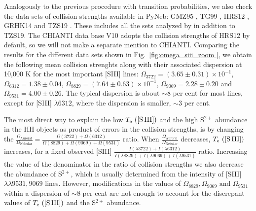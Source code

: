 \documentclass[fleqn,usenatbib]{mnras}
\begin{document}
Analogously to the previous procedure with transition probabilities, we also check the data sets of collision strengths available in PyNeb: GMZ95 \citep[][]{GMZ95}, TG99 \citep[][]{TG99}, HRS12 \citep[][]{HRS12}, GRHK14 \citep[][]{GRHK14} and TZS19 \citep[][]{TZS19}. These includes all the sets analyzed by \citet{Juan-de-Dios17} in addition to TZS19. The CHIANTI data base V10 adopts the collision strengths of HRS12 by default, so we will not make a separate mention to CHIANTI. Comparing the results for the different data sets shown in Fig.~\ref{fig:omega_siii_zoom }, we obtain the following mean collision strenghts along  with their associated dispersion at 10,000 K for the most important [S\thinspace III] lines: $\Omega_{3722}=(3.65 \pm 0.31) \times 10^{-1}$, $\Omega_{6312}=1.38 \pm 0.04$, $\Omega_{8829}=(7.64 \pm 0.63)\times 10^{-1}$, $\Omega_{9069}=2.28 \pm 0.20$ and $\Omega_{9531}=4.00 \pm 0.26$. The typical dispersion is about $\sim 8$ per cent for most lines, except for [S\thinspace III] $\lambda 6312$, where the dispersion is smaller, $\sim 3$ per cent.

The most direct way to explain the low $T_{\rm e} \text{ ([S\thinspace III])}$ and the high S$^{2+}$ abundance in the HH objects as product of errors in the collision strengths, is by changing the  $\frac{\Omega_{\text{Auroral}}}{\Omega_{\text{Nebular}}}=\frac{\Omega(3722)+\Omega(6312)}{\Omega(8829)+\Omega(9069)+\Omega(9531)}$ ratio. When $\frac{\Omega_{\text{Auroral}}}{\Omega_{\text{Nebular}}}$ decreases, $T_{\rm e} \text{ ([S\thinspace III])}$ increases, for a fixed observed [S\thinspace III] $\frac{I(\lambda3722)+I(\lambda6312)}{I(\lambda 8829)+I(\lambda9069)+I(\lambda9531)}$ ratio. Increasing the value of the denominator in the ratio of collision strengths we also decrease the abundance of S$^{2+}$, which is usually determined from the intensity of [S\thinspace III] $\lambda \lambda 9531, 9069$ lines. However, modifications in the values of $\Omega_{8829}, \Omega_{9069} \text{ and } \Omega_{9531}$ within a dispersion of $\sim8$ per cent are not enough to account for the discrepant values of $T_{\rm e} \text{ ([S\thinspace III])}$ and the S$^{2+}$ abundance.
\end{document}

